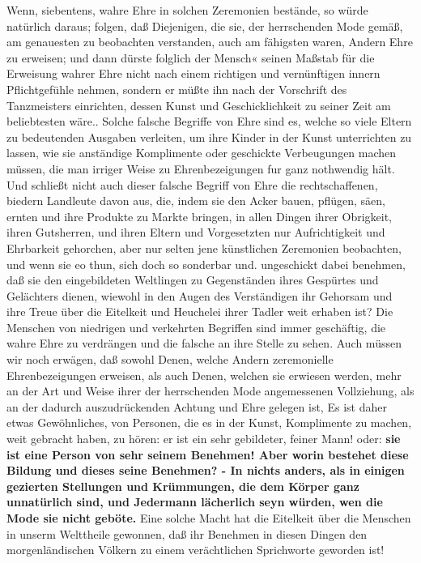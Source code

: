Wenn, siebentens, wahre Ehre in solchen Zeremonien bestände, so würde natürlich
daraus; folgen, daß Diejenigen, die sie, der herrschenden Mode gemäß, am
genauesten zu beobachten verstanden, auch am fähigsten waren, Andern Ehre zu
erweisen; und dann dürste folglich der Mensch« seinen Maßstab für die Erweisung
wahrer Ehre nicht nach einem richtigen und vernünftigen innern Pflichtgefühle
nehmen, sondern er müßte ihn nach der Vorschrift des Tanzmeisters einrichten,
dessen Kunst und Geschicklichkeit zu seiner Zeit am beliebtesten wäre.. Solche
falsche Begriffe von Ehre sind es, welche so viele Eltern zu bedeutenden
Ausgaben verleiten, um ihre Kinder in der Kunst unterrichten zu lassen, wie sie
anständige Komplimente oder geschickte Verbeugungen machen müssen, die man
irriger Weise zu Ehrenbezeigungen fur ganz nothwendig hält. Und schließt nicht
auch dieser falsche Begriff von Ehre die rechtschaffenen, biedern Landleute
davon aus, die, indem sie den Acker bauen, pflügen, säen, ernten und ihre
Produkte zu Markte bringen, in allen Dingen ihrer Obrigkeit, ihren Gutsherren,
und ihren Eltern und Vorgesetzten nur Aufrichtigkeit und Ehrbarkeit gehorchen,
aber nur selten jene künstlichen Zeremonien beobachten, und wenn sie eo thun,
sich doch so sonderbar und. ungeschickt dabei benehmen, daß sie den
eingebildeten Weltlingen zu Gegenständen ihres Gespürtes und Gelächters dienen,
wiewohl in den Augen des Verständigen ihr Gehorsam und ihre Treue über die
Eitelkeit und Heuchelei ihrer Tadler weit erhaben ist? Die Menschen von
niedrigen und verkehrten Begriffen sind immer geschäftig, die wahre Ehre zu
verdrängen und die falsche an ihre Stelle zu sehen. Auch müssen wir noch
erwägen, daß sowohl Denen, welche Andern zeremonielle Ehrenbezeigungen erweisen,
als auch Denen, welchen sie erwiesen werden, mehr an der Art und Weise ihrer der
herrschenden Mode angemessenen Vollziehung, als an der dadurch auszudrückenden
Achtung und Ehre gelegen ist, Es ist daher etwas Gewöhnliches, von Personen, die
es in der Kunst, Komplimente zu machen, weit gebracht haben, zu hören: er ist
ein sehr gebildeter, feiner Mann! oder: \textbf{sie ist eine Person von sehr seinem
Benehmen! Aber worin bestehet diese Bildung und dieses seine Benehmen? - In
nichts anders, als in einigen gezierten Stellungen und Krümmungen, die dem
Körper ganz unnatürlich sind, und Jedermann lächerlich seyn würden, wen die Mode
sie nicht geböte.} Eine solche Macht hat die Eitelkeit über die Menschen in
unserm Welttheile gewonnen, daß ihr Benehmen in diesen Dingen den
morgenländischen Völkern zu einem verächtlichen Sprichworte geworden ist!

